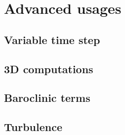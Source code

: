 \documentclass{report}
\newcommand{\todo}[1]{This section still has to be written by #1}
\begin{document}



\section{Advanced usages}

	\subsection{Variable time step}
	

	\subsection{3D computations}
	

	\subsection{Baroclinic terms}
	


	\subsection{Turbulence}
	


\end{document}
